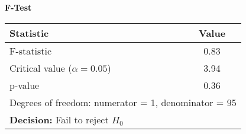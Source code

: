 \noindent\textbf{F-Test}\\
\begin{tabular}{lc}
\hline
Statistic & Value \\
\hline
F-statistic & 0.83 \\
Critical value ($\alpha=0.05$) & 3.94 \\
p-value & 0.36 \\
\hline
\multicolumn{2}{l}{Degrees of freedom: numerator = 1, denominator = 95} \\
\multicolumn{2}{l}{\textbf{Decision:} Fail to reject $H_0$} \\
\end{tabular}

